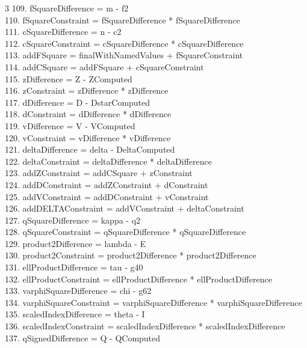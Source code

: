 \documentclass[10pt]{article}
\begin{document}
\begin{multicols}{3}
109. fSquareDifference = m - f2\\
110. fSquareConstraint = fSquareDifference * fSquareDifference\\
111. cSquareDifference = n - c2\\
112. cSquareConstraint = cSquareDifference * cSquareDifference\\
113. addFSquare = finalWithNamedValues + fSquareConstraint\\
114. addCSquare = addFSquare + cSquareConstraint\\
115. zDifference = Z - ZComputed\\
116. zConstraint = zDifference * zDifference\\
117. dDifference = D - DstarComputed\\
118. dConstraint = dDifference * dDifference\\
119. vDifference = V - VComputed\\
120. vConstraint = vDifference * vDifference\\
121. deltaDifference = delta - DeltaComputed\\
122. deltaConstraint = deltaDifference * deltaDifference\\
123. addZConstraint = addCSquare + zConstraint\\
124. addDConstraint = addZConstraint + dConstraint\\
125. addVConstraint = addDConstraint + vConstraint\\
126. addDELTAConstraint = addVConstraint + deltaConstraint\\
127. qSquareDifference = kappa - q2\\
128. qSquareConstraint = qSquareDifference * qSquareDifference\\
129. product2Difference = lambda - E\\
130. product2Constraint = product2Difference * product2Difference\\
131. ellProductDifference = tau - g40\\
132. ellProductConstraint = ellProductDifference * ellProductDifference\\
133. varphiSquareDifference = chi - g62\\
134. varphiSquareConstraint = varphiSquareDifference * varphiSquareDifference\\
135. scaledIndexDifference = theta - I\\
136. scaledIndexConstraint = scaledIndexDifference * scaledIndexDifference\\
137. qSignedDifference = Q - QComputed\\

\end{multicols}
\end{document}

